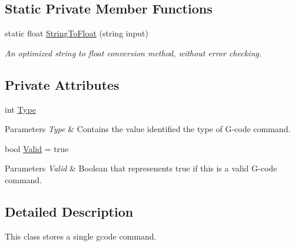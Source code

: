 \subsection*{Static Private Member Functions}
\begin{DoxyCompactItemize}
\item 
static float \hyperlink{class_gcode_command_a7e60f42effcf4a0053d812e16ffa3895}{String\+To\+Float} (string input)
\begin{DoxyCompactList}\small\item\em An optimized string to float conversion method, without error checking. \end{DoxyCompactList}\end{DoxyCompactItemize}
\subsection*{Private Attributes}
\begin{DoxyCompactItemize}
\item 
\mbox{\label{class_gcode_command_acd40d4810d479c4913f7958d75356bbe}} 
int \hyperlink{class_gcode_command_acd40d4810d479c4913f7958d75356bbe}{Type}
\begin{DoxyCompactList}\small\item\em 
\begin{DoxyParams}{Parameters}
{\em Type} & Contains the value identified the type of G-\/code command.\\
\hline
\end{DoxyParams}
\end{DoxyCompactList}\item 
\mbox{\label{class_gcode_command_a958029bcc2cc71475f99bee849182a47}} 
bool \hyperlink{class_gcode_command_a958029bcc2cc71475f99bee849182a47}{Valid} = true
\begin{DoxyCompactList}\small\item\em 
\begin{DoxyParams}{Parameters}
{\em Valid} & Boolean that represenents true if this is a valid G-\/code command.\\
\hline
\end{DoxyParams}
\end{DoxyCompactList}\end{DoxyCompactItemize}


\subsection{Detailed Description}
This class stores a single gcode command. 



